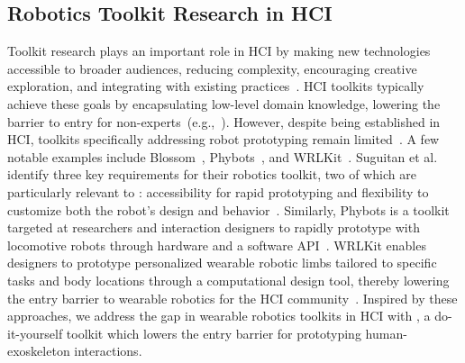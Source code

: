 \subsection{Robotics Toolkit Research in HCI}
Toolkit research plays an important role in HCI by making new technologies accessible to broader audiences, reducing complexity, encouraging creative exploration, and integrating with existing practices~\cite{ledo_2018}. HCI toolkits typically achieve these goals by encapsulating low-level domain knowledge, lowering the barrier to entry for non-experts~(e.g.,~\cite{lei_2022, arabi_2022,li_2019}). However, despite being established in HCI, toolkits specifically addressing robot prototyping remain limited~\cite{suguitan_2019}. A few notable examples include Blossom~\cite{suguitan_2019}, Phybots~\cite{kato_2012}, and WRLKit~\cite{saberpour_2023}. Suguitan et al. identify three key requirements for their robotics toolkit, two of which are particularly relevant to \toolkit: accessibility for rapid prototyping and flexibility to customize both the robot's design and behavior~\cite{suguitan_2019}. 
Similarly, Phybots is a toolkit targeted at researchers and interaction designers to rapidly prototype with locomotive robots through hardware and a software API~\cite{kato_2012}.
WRLKit enables designers to prototype personalized wearable robotic limbs tailored to specific tasks and body locations through a computational design tool, thereby lowering the entry barrier to wearable robotics for the HCI community~\cite{saberpour_2023}. 
Inspired by these approaches, we address the gap in wearable robotics toolkits in HCI with \toolkit, a do-it-yourself toolkit which lowers the entry barrier for prototyping human-exoskeleton interactions.

